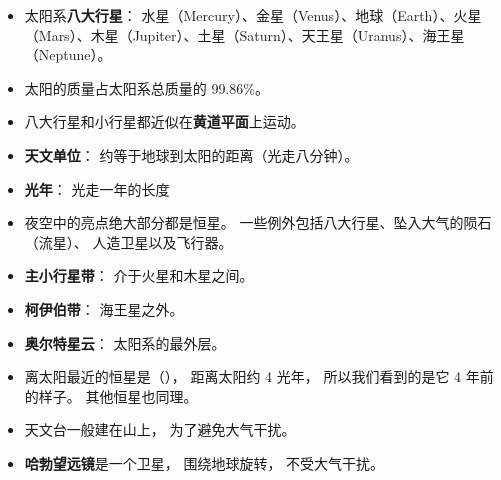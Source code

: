 
\begin{issues}
\issueDraft
\end{issues}


\begin{itemize}
\item 太阳系\textbf{八大行星}： 水星（Mercury）、金星（Venus）、地球（Earth）、火星（Mars）、木星（Jupiter）、土星（Saturn）、天王星（Uranus）、海王星（Neptune）。
\item 太阳的质量占太阳系总质量的 99.86\%。
\item 八大行星和小行星都近似在\textbf{黄道平面}上运动。
\item \textbf{天文单位}： 约等于地球到太阳的距离（光走八分钟）。
\item \textbf{光年}： 光走一年的长度
\item 夜空中的亮点绝大部分都是恒星。 一些例外包括八大行星、坠入大气的陨石（流星）、 人造卫星以及飞行器。
\item \textbf{主小行星带}： 介于火星和木星之间。
\item \textbf{柯伊伯带}： 海王星之外。
\item \textbf{奥尔特星云}： 太阳系的最外层。
\item 离太阳最近的恒星是（）， 距离太阳约 4 光年， 所以我们看到的是它 4 年前的样子。 其他恒星也同理。
\item 天文台一般建在山上， 为了避免大气干扰。
\item \textbf{哈勃望远镜}是一个卫星， 围绕地球旋转， 不受大气干扰。
\end{itemize}

